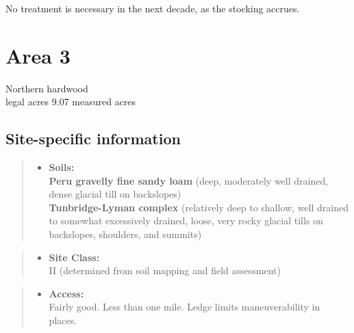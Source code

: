 \documentclass[]{tufte-handout}
\providecommand{\tightlist}{%
  \setlength{\itemsep}{0pt}\setlength{\parskip}{0pt}}
\begin{document}
No treatment is necessary in the next decade, as the stocking accrues.

\newpage

\section{Area 3}\label{area-3}

Northern hardwood\\
 legal acres \textbar{} 9.07 measured acres

\subsection{Site-specific
information}\label{site-specific-information-2}

\begin{quote}
\begin{itemize}
\tightlist
\item
  \textbf{Soils:}\\
  \indent\indent  \textbf{Peru gravelly fine sandy loam} (deep,
  moderately well drained, dense glacial till on backslopes)\\
  \textbf{Tunbridge-Lyman complex} (relatively deep to shallow, well
  drained to somewhat excessively drained, loose, very rocky glacial
  tills on backslopes, shoulders, and summits)
\end{itemize}
\end{quote}

\begin{quote}
\begin{itemize}
\tightlist
\item
  \textbf{Site Class:}\\
  \vspace{2pt} II (determined from soil mapping and field assessment)
\end{itemize}
\end{quote}

\begin{quote}
\begin{itemize}
\tightlist
\item
  \textbf{Access:}\\
  \vspace{2pt} Fairly good. Less than one mile. Ledge limits
  maneuverability in places.
\end{itemize}
\end{quote}
\end{document}
